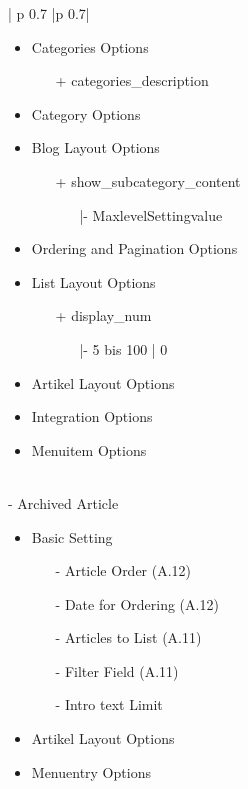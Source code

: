 \begin{minipage}{0.7\textwidth}
\begin{longtable}{| p {0.7\textwidth} |p {0.7\textwidth}|}
\begin{itemize}
      	\item Categories Options
      		\begin{enumerate}
      		    \item[+] categories\_description
      		   \end{enumerate}
   	   	\item Category Options
   	   	\item Blog Layout Options
   	   		\begin{enumerate}
   	   	   	   			\item[+] show\_subcategory\_content
   	   	   			         \begin{enumerate}
   	   	   			          \item[|-] MaxlevelSettingvalue
   	   	   			         \end{enumerate}
   	   	   	   		\end{enumerate}
   	   	\item Ordering and Pagination Options
   	   	\item List Layout Options
   	   	\begin{enumerate}
   	   	\item[+] display\_num
   	   	\begin{enumerate}
   	   				\item[|-] 5 bis 100 | 0
   	   			\end{enumerate}
   	   	\end{enumerate}
   	   	\item Artikel Layout Options
   	   	\item Integration Options
   	   	\item Menuitem Options  
     \end{itemize}   
 	\\ - Archived Article
\begin{itemize}
 \item Basic  Setting 
   		\begin{enumerate}
   		\item[-] Article Order (A.12) 
   		\item[-] Date for Ordering (A.12) 
   		\item[-] Articles to List (A.11)
   		\item[-] Filter Field (A.11) 
   		\item[-] Intro text Limit
   		\end{enumerate}
 	\item Artikel Layout Options
	\item Menuentry Options

\end{itemize}
\end{longtable}
\end{minipage}
